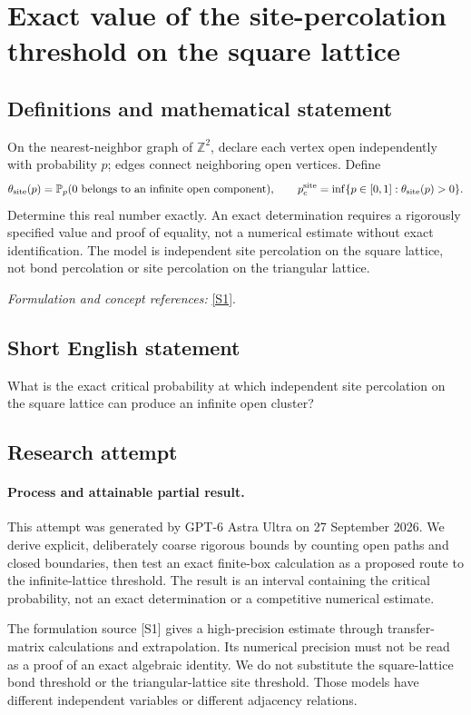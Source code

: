\documentclass[11pt]{article}
\begin{document}
\section*{\texorpdfstring{Exact value of the site-percolation threshold on the square lattice}{Exact value of the site-percolation threshold on the square lattice}}\label{433}
\subsection{Definitions and mathematical statement}
On the nearest-neighbor graph of ${\mathbb{Z}}^2$, declare each vertex open independently with probability $p$; edges connect neighboring open vertices. Define
\[
 \theta_{\rm site}(p)={\mathbb{P}}_p(0\text{ belongs to an infinite open component}),
 \qquad
 p_c^{\rm site}=\inf\{p\in[0,1]:\theta_{\rm site}(p)>0\}.
\]
Determine this real number exactly. An exact determination requires a rigorously specified value and proof of equality, not a numerical estimate without exact identification. The model is independent site percolation on the square lattice, not bond percolation or site percolation on the triangular lattice.
\par\smallskip\textit{Formulation and concept references:} \href{https://arxiv.org/abs/1507.03027}{[S1]}.

\subsection{Short English statement}
What is the exact critical probability at which independent site percolation on the square lattice can produce an infinite open cluster?
\subsection{Research attempt}
\paragraph{Process and attainable partial result.}
This attempt was generated by GPT-6 Astra Ultra on 27 September 2026. We derive explicit, deliberately coarse rigorous bounds by counting open paths and closed boundaries, then test an exact finite-box calculation as a proposed route to the infinite-lattice threshold. The result is an interval containing the critical probability, not an exact determination or a competitive numerical estimate.

The formulation source [S1] gives a high-precision estimate through transfer-matrix calculations and extrapolation. Its numerical precision must not be read as a proof of an exact algebraic identity. We do not substitute the square-lattice bond threshold or the triangular-lattice site threshold. Those models have different independent variables or different adjacency relations.
\end{document}
